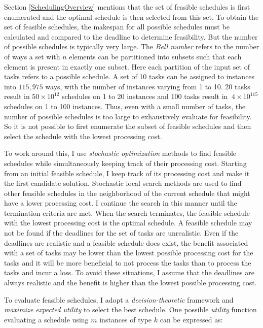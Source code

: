 \documentclass[12pt]{report}
\begin{document}
Section \ref{SchedulingOverview} mentions that the set of feasible schedules is first enumerated and the optimal schedule is then selected from this set.
To obtain the set of feasible schedules, the makespan for all possible schedules must be calculated and compared to the deadline to determine feasibility.
But the number of possible schedules is typically very large.
The \textit{Bell number} \cite{mathworld:bellnumber} refers to the number of ways a set with $n$ elements can be partitioned into subsets such that each element is present in exactly one subset.
Here each partition of the input set of tasks refers to a possible schedule.
A set of 10 tasks can be assigned to instances into $115,975$ ways, with the number of instances varying from 1 to 10.
20 tasks result in $50 \times 10^{12}$ schedules on 1 to 20 instances and 100 tasks result in $~ 4 \times 10^{115}$ schedules on 1 to 100 instances.
Thus, even with a small number of tasks, the number of possible schedules is too large to exhaustively evaluate for feasibility.
So it is not possible to first enumerate the subset of feasible schedules and then select the schedule with the lowest processing cost.

To work around this, I use \textit{stochastic optimization} methods to find feasible schedules while simultaneously keeping track of their processing cost.
Starting from an initial feasible schedule, I keep track of its processing cost and make it the first candidate solution.
Stochastic local search methods are used to find other feasible schedules in the neighborhood of the current schedule that might have a lower processing cost.
I continue the search in this manner until the termination criteria are met.
When the search terminates, the feasible schedule with the lowest processing cost is the optimal schedule.
A feasible schedule may not be found if the deadlines for the set of tasks are unrealistic.
Even if the deadlines are realistic and a feasible schedule does exist, the benefit associated with a set of tasks may be lower than the lowest possible processing cost for the tasks and it will be more beneficial to not process the tasks than to process the tasks and incur a loss.
To avoid these situations, I assume that the deadlines are always realistic and the benefit is higher than the lowest possible processing cost.

To evaluate feasible schedules, I adopt a \textit{decision-theoretic} framework and \textit{maximize expected utility} \cite{BernadoSmith} to select the best schedule.
One possible \textit{utility} function evaluating a schedule using $m$ instances of type $k$ can be expressed as:
\end{document}
